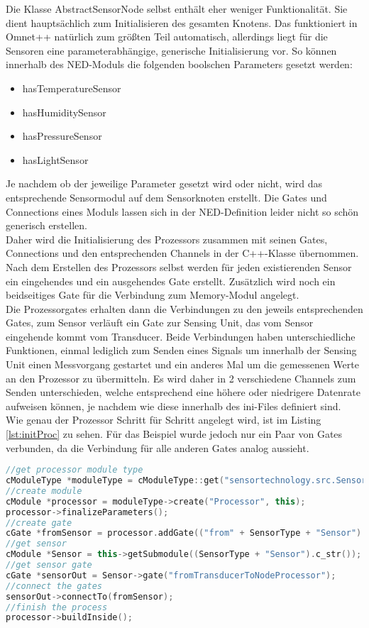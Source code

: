 Die Klasse AbstractSensorNode selbst enthält eher weniger Funktionalität. Sie dient hauptsächlich zum Initialisieren des gesamten Knotens. Das funktioniert in Omnet++ natürlich zum größten Teil automatisch, allerdings liegt für die Sensoren eine parameterabhängige, generische Initialisierung vor. So können innerhalb des NED-Moduls die folgenden boolschen Parameters gesetzt werden:
\begin{itemize}
\item hasTemperatureSensor
\item hasHumiditySensor
\item hasPressureSensor
\item hasLightSensor
\end{itemize}
Je nachdem ob der jeweilige Parameter gesetzt wird oder nicht, wird das entsprechende Sensormodul auf dem Sensorknoten erstellt. Die Gates und Connections eines Moduls lassen sich in der NED-Definition leider nicht so schön generisch erstellen.\\
Daher wird die Initialisierung des Prozessors zusammen mit seinen Gates, Connections und den entsprechenden Channels in der C++-Klasse übernommen. Nach dem Erstellen des Prozessors selbst werden für jeden existierenden Sensor ein eingehendes und ein ausgehendes Gate erstellt. Zusätzlich wird noch ein beidseitiges Gate für die Verbindung zum Memory-Modul angelegt.\\
Die Prozessorgates erhalten dann die Verbindungen zu den jeweils entsprechenden Gates, zum Sensor verläuft ein Gate zur Sensing Unit, das vom Sensor eingehende kommt vom Transducer. Beide Verbindungen haben unterschiedliche Funktionen, einmal lediglich zum Senden eines Signals um innerhalb der Sensing Unit einen Messvorgang gestartet und ein anderes Mal um die gemessenen Werte an den Prozessor zu übermitteln. Es wird daher in 2 verschiedene Channels zum Senden unterschieden, welche entsprechend eine höhere oder niedrigere Datenrate aufweisen können, je nachdem wie diese innerhalb des ini-Files definiert sind.\\
Wie genau der Prozessor Schritt für Schritt angelegt wird, ist im Listing \ref{lst:initProc} zu sehen. Für das Beispiel wurde jedoch nur ein Paar von Gates verbunden, da die Verbindung für alle anderen Gates analog aussieht.

\begin{lstlisting}[language=C++, label=lst:initProc, caption=teilweise Initialisierung des Prozessors]
//get processor module type
cModuleType *moduleType = cModuleType::get("sensortechnology.src.SensorNode.Processor.Processor");
//create module
cModule *processor = moduleType->create("Processor", this);
processor->finalizeParameters();
//create gate
cGate *fromSensor = processor.addGate(("from" + SensorType + "Sensor").c_str(), cGate::INPUT);
//get sensor
cModule *Sensor = this->getSubmodule((SensorType + "Sensor").c_str());
//get sensor gate
cGate *sensorOut = Sensor->gate("fromTransducerToNodeProcessor");    
//connect the gates
sensorOut->connectTo(fromSensor);    
//finish the process
processor->buildInside();
\end{lstlisting}

